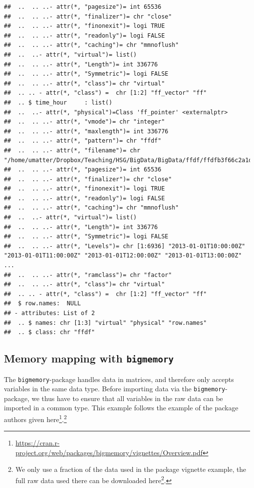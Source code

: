 \documentclass[
  12pt,
]{style/krantz}
\renewcommand{\href}[2]{#2\footnote{\url{#1}}}
\begin{document}
\begin{verbatim}
##  ..  .. ..- attr(*, "pagesize")= int 65536
##  ..  .. ..- attr(*, "finalizer")= chr "close"
##  ..  .. ..- attr(*, "finonexit")= logi TRUE
##  ..  .. ..- attr(*, "readonly")= logi FALSE
##  ..  .. ..- attr(*, "caching")= chr "mmnoflush"
##  ..  ..- attr(*, "virtual")= list()
##  ..  .. ..- attr(*, "Length")= int 336776
##  ..  .. ..- attr(*, "Symmetric")= logi FALSE
##  ..  .. ..- attr(*, "class")= chr "virtual"
##  .. .. - attr(*, "class") =  chr [1:2] "ff_vector" "ff"
##  .. $ time_hour     : list()
##  ..  ..- attr(*, "physical")=Class 'ff_pointer' <externalptr> 
##  ..  .. ..- attr(*, "vmode")= chr "integer"
##  ..  .. ..- attr(*, "maxlength")= int 336776
##  ..  .. ..- attr(*, "pattern")= chr "ffdf"
##  ..  .. ..- attr(*, "filename")= chr "/home/umatter/Dropbox/Teaching/HSG/BigData/BigData/ffdf/ffdfb3f66c2a1d45.ff"
##  ..  .. ..- attr(*, "pagesize")= int 65536
##  ..  .. ..- attr(*, "finalizer")= chr "close"
##  ..  .. ..- attr(*, "finonexit")= logi TRUE
##  ..  .. ..- attr(*, "readonly")= logi FALSE
##  ..  .. ..- attr(*, "caching")= chr "mmnoflush"
##  ..  ..- attr(*, "virtual")= list()
##  ..  .. ..- attr(*, "Length")= int 336776
##  ..  .. ..- attr(*, "Symmetric")= logi FALSE
##  ..  .. ..- attr(*, "Levels")= chr [1:6936] "2013-01-01T10:00:00Z" "2013-01-01T11:00:00Z" "2013-01-01T12:00:00Z" "2013-01-01T13:00:00Z" ...
##  ..  .. ..- attr(*, "ramclass")= chr "factor"
##  ..  .. ..- attr(*, "class")= chr "virtual"
##  .. .. - attr(*, "class") =  chr [1:2] "ff_vector" "ff"
##  $ row.names:  NULL
## - attributes: List of 2
##  .. $ names: chr [1:3] "virtual" "physical" "row.names"
##  .. $ class: chr "ffdf"
\end{verbatim}

\hypertarget{memory-mapping-with-bigmemory}{%
\subsection{\texorpdfstring{Memory mapping with \texttt{bigmemory}}{Memory mapping with bigmemory}}\label{memory-mapping-with-bigmemory}}

The \texttt{bigmemory}-package handles data in matrices, and therefore only accepts variables in the same data type. Before importing data via the \texttt{bigmemory}-package, we thus have to ensure that all variables in the raw data can be imported in a common type. This example follows the example of the package authors given \href{https://cran.r-project.org/web/packages/bigmemory/vignettes/Overview.pdf}{here}.\footnote{We only use a fraction of the data used in the package vignette example, the full raw data used there can be downloaded \href{http://stat-computing.org/dataexpo/2009/the-data.html}{here}.}
\end{document}
